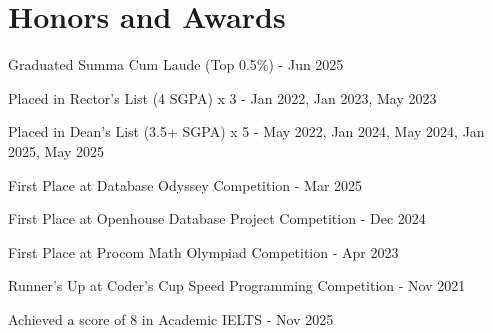 \documentclass[a4paper,20pt]{article}
\makeatletter
\newcommand{\resumeSubheading}[4]{
  \vspace{-1pt}\item
    \begin{tabular*}{0.97\textwidth}{l@{\extracolsep{\fill}}r}
      \textbf{#1} & #2 \\
      \textit{#3} & \textit{#4} \\
    \end{tabular*}\vspace{-5pt}
}
\newcommand{\resumeSubHeadingListStart}{\begin{itemize}[leftmargin=*]}
\newcommand{\resumeSubHeadingListEnd}{\end{itemize}}
\makeatother
\begin{document}
\section{Honors and Awards}
\begin{description}[font=$\bullet$]

\item {Graduated Summa Cum Laude (Top 0.5\%) - Jun 2025}
\vspace{-5pt}
\item {Placed in Rector's List (4 SGPA) x 3 - Jan 2022, Jan 2023, May 2023}
\vspace{-5pt}
\item {Placed in Dean's List (3.5+ SGPA) x 5 - May 2022, Jan 2024, May 2024, Jan 2025, May 2025}
\vspace{-5pt}
\item {First Place at Database Odyssey Competition - Mar 2025}
\vspace{-5pt}
\item {First Place at Openhouse Database Project Competition - Dec 2024}
\vspace{-5pt}
\item {First Place at Procom Math Olympiad Competition - Apr 2023}
\vspace{-5pt}
\item {Runner's Up at Coder's Cup Speed Programming Competition - Nov 2021}
\vspace{-5pt}
\item {Achieved a score of 8 in Academic IELTS - Nov 2025}

\end{description}

\end{document}
